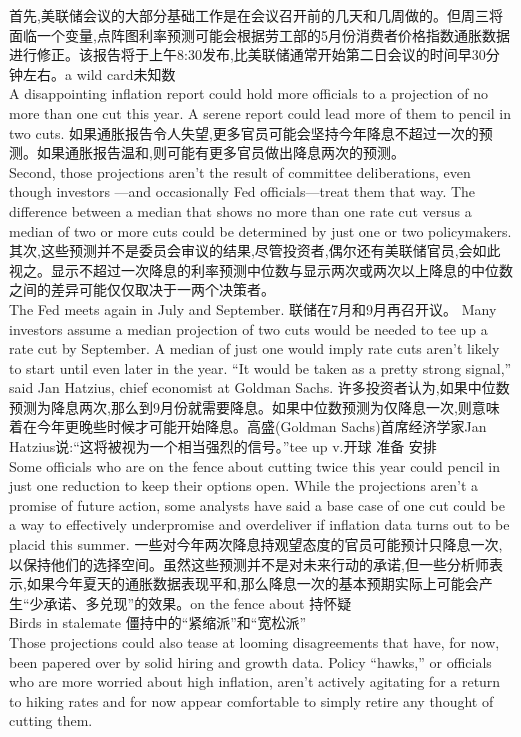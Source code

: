 \documentclass[a4paper,12pt]{article}
\begin{document}
首先,美联储会议的大部分基础工作是在会议召开前的几天和几周做的。但周三将面临一个变量,点阵图利率预测可能会根据劳工部的5月份消费者价格指数通胀数据进行修正。该报告将于上午8:30发布,比美联储通常开始第二日会议的时间早30分钟左右。a wild card未知数
\\A disappointing inflation report could hold more officials to a projection of no more than one cut this year. A serene report could lead more of them to pencil in two cuts. 
如果通胀报告令人失望,更多官员可能会坚持今年降息不超过一次的预测。如果通胀报告温和,则可能有更多官员做出降息两次的预测。
\\Second, those projections aren't the result of committee deliberations, even though investors —and occasionally Fed officials—treat them that way. The difference between a median that shows no more than one rate cut versus a median of two or more cuts could be determined by just one or two policymakers. 
其次,这些预测并不是委员会审议的结果,尽管投资者,偶尔还有美联储官员,会如此视之。显示不超过一次降息的利率预测中位数与显示两次或两次以上降息的中位数之间的差异可能仅仅取决于一两个决策者。
\\The Fed meets again in July and September. 联储在7⽉和9⽉再召开议。
Many investors assume a median projection of two cuts would be needed to tee up a rate cut by September. A median of just one would imply rate cuts aren't likely to start until even later in the year. “It would be taken as a pretty strong signal,” said Jan Hatzius, chief economist at Goldman Sachs.
许多投资者认为,如果中位数预测为降息两次,那么到9月份就需要降息。如果中位数预测为仅降息一次,则意味着在今年更晚些时候才可能开始降息。高盛(Goldman Sachs)首席经济学家Jan Hatzius说:“这将被视为一个相当强烈的信号。”tee up v.开球 准备 安排
\\Some officials who are on the fence about cutting twice this year could pencil in just one reduction to keep their options open. While the projections aren't a promise of future action, some analysts have said a base case of one cut could be a way to effectively underpromise and overdeliver if inflation data turns out to be placid this summer.
一些对今年两次降息持观望态度的官员可能预计只降息一次,以保持他们的选择空间。虽然这些预测并不是对未来行动的承诺,但一些分析师表示,如果今年夏天的通胀数据表现平和,那么降息一次的基本预期实际上可能会产生“少承诺、多兑现”的效果。on the fence about 持怀疑
\\Birds in stalemate
僵持中的“紧缩派”和“宽松派”
\\Those projections could also tease at looming disagreements that have, for now, been papered over by solid hiring and growth data. Policy “hawks,” or officials who are more worried about high inflation, aren't actively agitating for a return to hiking rates and for now appear comfortable to simply retire any thought of cutting them. 
\end{document}
